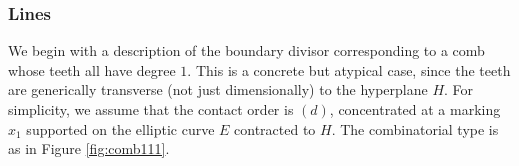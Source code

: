 \documentclass[11pt]{amsart}
\newcommand{\sqC}{\scalebox{0.8}[1.3]{$\sqsubset$}}
\newcommand{\PP}{\mathbb P}
\theoremstyle{definition}
\theoremstyle{definition}
\begin{document}
\begin{comment}

\begin{proof}[Proof of Lemma \ref{lem:corecontact}]
Consider the vertices that lie above $0\in\mathbb R_{\geq0}$ on the circle of radius $\delta$: the edges departing from them go directly (up to bubbling) to the core, since there cannot be stable vertices inside the open disc  when we have only one tropical parameter. In particular, all these edges have the same expansion factor $m$ (see again Figure \ref{fig:off_we_go}), which is maximal among those of the edges adjacent to the core. Indeed, all the edges from the core to the circle have the same length $\delta$, so the ones having maximal contact order are those that reach further from the core, and at least one must reach $0\in\mathbb R_{\geq0}$, for otherwise there would be an extra tropical parameter.

Finally, in case the maximal contact order is $m=1$, in order for $f_B$ to factor, the image of the tangent vectors at the components lying on the circle must be linearly dependent in $T_{\PP^m,x}$, where $x$ denotes the image of the core under $f_B$.in which case we can deduce as above that factorisation will be satisfied independently of the choice of alignment.
\end{proof}

For the remainder of this section we use the following notation for the combinatorial type $\Delta$; we let $\sqC_0$ denotes the vertex of dual graph corresponding to the core, $\sqC_1,\ldots,\sqC_r$ the other stable vertices (genus zero and lying on the circle, by the previous lemma) and $q_1,\ldots,q_r$ the corresponding splitting nodes.
 
\end{comment}
\subsubsection{Lines}\label{S:lines}
We begin with a description of the boundary divisor corresponding to a comb whose teeth all have degree $1$. This is a concrete but atypical case, since the teeth are generically transverse (not just dimensionally) to the hyperplane $H$. For simplicity, we assume that the contact order is $(d)$, concentrated at a marking $x_1$ supported on the elliptic curve $E$ contracted to $H$. The combinatorial type is as in Figure \ref{fig:comb111}.
\end{document}
